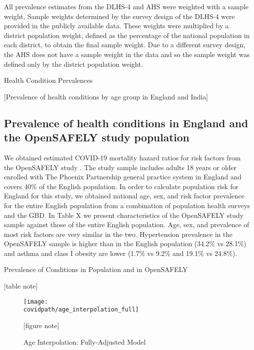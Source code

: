 \documentclass[10pt,letterpaper]{article}
\numberwithin{equation}{section}
\begin{document}
All prevalence estimates from the DLHS-4 and AHS were weighted with a sample weight. Sample weights determined by the survey design of the DLHS-4 were provided in the publicly available data. These weights were multiplied by a district population weight, defined as the percentage of the national population in each district, to obtain the final sample weight. Due to a different survey design, the AHS does not have a sample weight in the data and so the sample weight was defined only by the district population weight.

    \begin{table}[H]
    \begin{center}
     \caption{Health Condition Prevalences}
     
     
     \footnotesize{[Prevalence of health conditions by age group in England and India]}
    \end{center}
   \end{table}

\subsection{Prevalence of health conditions in England and the OpenSAFELY study population}
We obtained estimated COVID-19 mortality hazard ratios for risk factors from the OpenSAFELY study \cite{williamson_opensafely_2020}. The study sample includes adults 18 years or older enrolled with The Phoenix Partnership general practice system in England and covers 40\% of the English population. In order to calculate population risk for England for this study, we obtained national age, sex, and risk factor prevalence for the entire English population from a combination of population health surveys and the GBD. In Table X we present characteristics of the OpenSAFELY study sample against those of the entire English population. Age, sex, and prevalence of most risk factors are very similar in the two. Hypertension prevalence in the OpenSAFELY sample is higher than in the English population (34.2\% vs 28.1\%) and asthma and class I obesity are lower (1.7\% vs 9.2\% and 19.1\% vs 24.8\%).

   
  \begin{table}[H]
    \begin{center}
    \caption{Prevalence of Conditions in Population and in OpenSAFELY}
    
    
    \footnotesize{[table note]}
    \end{center}
  \end{table}


   \clearpage
  \begin{figure}[H]
    \begin{center}
    \caption{Age Interpolation: Fully-Adjusted Model}
    
    \texttt{[image: \\covidpath/age\_interpolation\_full]}
    
    \footnotesize{[figure note]}
    \end{center}
  \end{figure}
  
 
 
\end{document}
